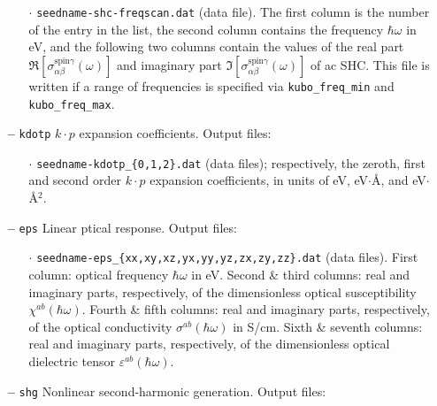 \begin{itemize}
\begin{itemize}
	\item[$\cdot$] {\tt seedname-shc-freqscan.dat} (data file). The
	first column is the number of the entry in the list, the second column contains the frequency $\hbar\omega$ in eV, and the
	following two columns contain the values of the real part 
	$\Re[\sigma_{\alpha\beta}^{\text{spin}\gamma}(\omega)]$ and imaginary part $\Im[\sigma_{\alpha\beta}^{\text{spin}\gamma}(\omega)]$ of ac SHC.  This file is written if a range of
	frequencies is specified via {\tt kubo\_freq\_min} and {\tt
		kubo\_freq\_max}. 
	
	\end{itemize}

\item[{\bf --}] \verb#kdotp# $k\cdot p$ expansion coefficients. Output files:

\begin{itemize}

\item[$\cdot$] {\tt seedname-kdotp\_{\{0,1,2\}.dat}}
  (data files);  respectively, the zeroth, first and second order $k\cdot p$ expansion coefficients,
  in units of eV, eV$\cdot$\AA, and  eV$\cdot$\AA$^{2}$.
  
\end{itemize}

\item[{\bf --}] \verb#eps# Linear ptical response. Output files:

\begin{itemize}

\item[$\cdot$] {\tt seedname-eps\_{\{xx,xy,xz,yx,yy,yz,zx,zy,zz\}.dat}}
  (data files).
  First column: optical frequency $\hbar\omega$ in
  eV. Second \& third columns: real and imaginary parts, respectively, of the dimensionless optical susceptibility $\chi^{ab}(\hbar\omega)$. Fourth \& fifth columns: real and imaginary parts, respectively, of the optical conductivity $\sigma^{ab}(\hbar\omega)$ in S/cm. Sixth \& seventh columns: real and imaginary parts, respectively, of the dimensionless optical dielectric tensor $\varepsilon^{ab}(\hbar\omega)$.
  
\end{itemize}

\item[{\bf --}] \verb#shg# Nonlinear second-harmonic generation. Output files:

\begin{itemize}


\end{itemize}
\end{itemize}
